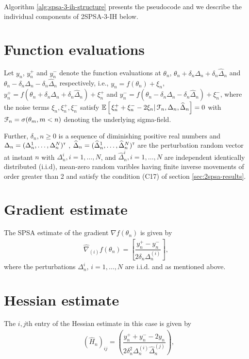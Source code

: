 Algorithm \ref{alg:spsa-3-ih-structure} presents the pseudocode and we describe the individual components of 2SPSA-3-IH below.
\section{Function evaluations}
Let $y_n$, $y_n^+$ and $y_n^-$ denote the function evaluations at $\theta_n$, $\theta_n+\delta_n \Delta_n+\delta_n \widehat \Delta_n$ and $\theta_n -\delta_n\Delta_n-\delta_n\widehat\Delta_n$ respectively, i.e., 
$y_n = f(\theta_n) + \xi_n$, $y_n^+ = f(\theta_n+\delta_n \Delta_n +\delta_n \widehat\Delta_n) + \xi_n^+$ and 
$y_n^- = f(\theta_n -\delta_n\Delta_n-\delta_n\widehat\Delta_n) + \xi_n^-$,
where the noise terms $\xi_n, \xi_n^+, \xi_n^-$ satisfy $\mathbb{E}\left[\left.\xi_n^+ + \xi_n^- - 2\xi_n \right| \mathcal{F}_n, \Delta_n, \widehat \Delta_n\right] = 0$ with $\mathcal{F}_n = \sigma(\theta_m,m <  n)$ denoting the underlying sigma-field.

Further, $\delta_n, n\geq 0$ is a sequence of diminishing positive real numbers and $\Delta_n = (\Delta_n^1,\ldots,\Delta_n^N)^\mathsf{\scriptscriptstyle T}$ , $\widehat\Delta_n = (\widehat\Delta_n^1,\ldots,\widehat\Delta_n^N)^\mathsf{\scriptscriptstyle T}$ are the perturbation random vector at instant $n$ with $\Delta_n^i,i=1,\ldots,N$, and $\widehat\Delta_n^i,i=1,\ldots,N$ are independent identically distributed (i.i.d), mean-zero random varibles having finite inverse movements of order greater than 2 and satisfy the condition (C17) of section \ref{sec:2spsa-results}.  

\section{Gradient estimate}
The SPSA estimate of the gradient $\nabla f(\theta_n)$ is given by
\begin{align}
\label{eq:grad-spsa}
\widehat\nabla_{(i)} f(\theta_n) =  \left[ \dfrac{y_n^+ - y_n^-}{2\delta_n \Delta_n^{(i)}}\right],
\end{align}
where the perturbations $\Delta_n^i$, $i=1,\ldots,N$ are i.i.d. and as mentioned above.


\section{Hessian estimate}
The $i,j$th entry of the Hessian estimate in this case is given by
\begin{align}
\label{eq:2spsa-ber}
&\left(\widehat H_n\right)_{ij} =  \left(\dfrac{y_n^+ + y_n^- - 2 y_n}{2\delta_n^2 \Delta_n^{(i)} \widehat \Delta_n^{(j)}}\right), 
\end{align}
